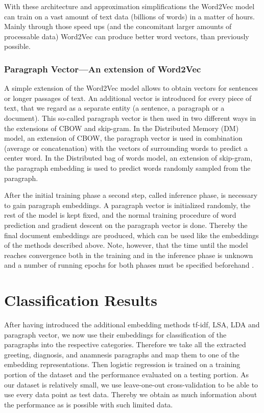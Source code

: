 With these architecture and approximation simplifications the Word2Vec
model can train on a vast amount of text data (billions of
words) in a matter of hours. Mainly through those speed ups (and the concomitant larger amounts of processable data) Word2Vec can produce better word vectors, than previously possible.

\subsubsection*{Paragraph Vector---An extension of Word2Vec}

A simple extension of the Word2Vec model allows to obtain vectors
for sentences or longer passages of text. An additional vector is
introduced for every piece of text, that we regard as a separate entity
(a sentence, a paragraph or a document). This so-called paragraph
vector is then used in two different ways in the extensions of CBOW
and skip-gram. In the Distributed Memory (DM) model, an extension
of CBOW, the paragraph vector is used in combination (average or concatenation)
with the vectors of surrounding words to predict a center word. In
the Distributed bag of words model, an extension of skip-gram, the
paragraph embedding is used to predict words randomly sampled from
the paragraph.

After the initial training phase a second step, called inference phase, is necessary to gain paragraph embeddings. A paragraph vector is initialized randomly, the rest of the model is kept fixed, and the normal training procedure of word prediction and gradient descent on the paragraph vector is done. Thereby the final document embeddings are produced, which can be used like the embeddings of the methods described above. Note, however, that the time until the model reaches convergence both in the training and in the inference phase is unknown and a number of running epochs for both phases must be specified beforehand \citep{Le2014}.





\section*{Classification Results}

After having introduced the additional embedding methods tf-idf, LSA, LDA and paragraph vector, we now use their embeddings for classification of the paragraphs into the respective categories. Therefore we take all the extracted greeting, diagnosis, and anamnesis paragraphs and map them to one of the embedding representations. Then logistic regression is trained on a training portion of the dataset and the performance evaluated on a testing portion. As our dataset is relatively small, we use leave-one-out cross-validation to be able to use every data point as test data. Thereby we obtain as much information about the performance as is possible with such limited data.

